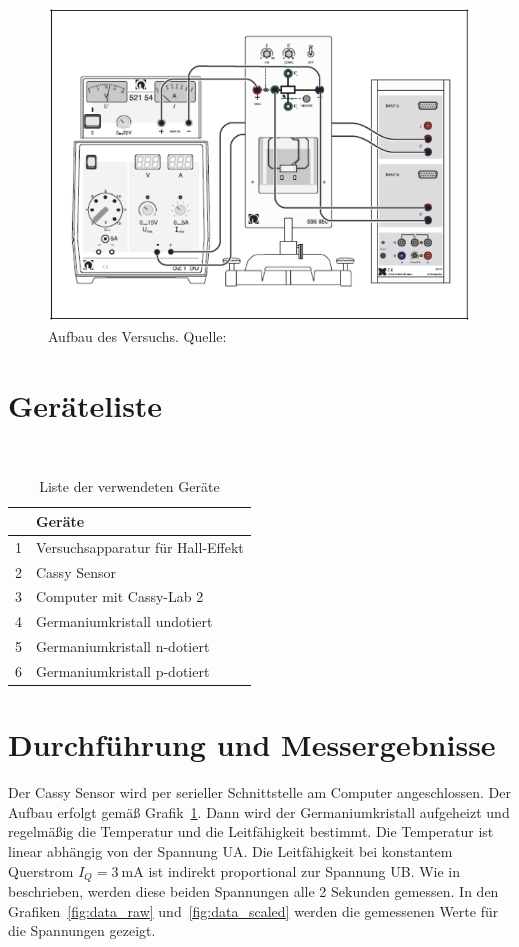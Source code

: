 \documentclass{article}
\begin{document}
\begin{figure}[H]
\includegraphics[scale=1.79]{versuchsaufbau.png}
\caption{Aufbau des Versuchs. Quelle: \cite{moodle}}
\label{fig:aufbau}
\end{figure}



\section{Geräteliste}


\begin{table}[H]
\caption{Liste der verwendeten Geräte}
~
\begin{tabular}{l|l}
 & Geräte  \\
\hline
1 & Versuchsapparatur für Hall-Effekt \\
2 & Cassy Sensor \\
3 & Computer mit Cassy-Lab 2 \\
4 & Germaniumkristall undotiert \\
5 & Germaniumkristall n-dotiert \\
6 & Germaniumkristall p-dotiert 
\end{tabular}

\end{table}

\newpage

\section{Durchführung und Messergebnisse}

Der Cassy Sensor wird per serieller Schnittstelle am Computer angeschlossen. Der Aufbau erfolgt gemäß Grafik~\ref{fig:aufbau}. Dann wird der Germaniumkristall aufgeheizt und regelmäßig die Temperatur und die Leitfähigkeit bestimmt. Die Temperatur ist linear abhängig von der Spannung UA. Die Leitfähigkeit bei konstantem Querstrom $I_Q=3~$mA ist indirekt proportional zur Spannung UB. Wie in \cite{moodle} beschrieben, werden diese beiden Spannungen alle 2 Sekunden gemessen. In den Grafiken~\ref{fig:data_raw} und~\ref{fig:data_scaled} werden die gemessenen Werte für die Spannungen gezeigt.
\end{document}

